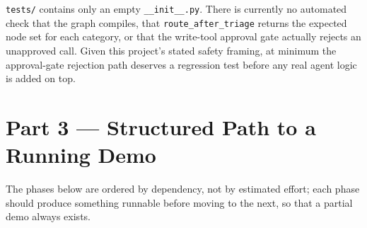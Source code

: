 \documentclass[11pt]{article}
\newenvironment{bugbox}[1]{%
  \begin{tcolorbox}[colback=bugred!5,colframe=bugred!70!black,title=\textbf{#1},fonttitle=\bfseries,boxrule=0.6pt]
}{\end{tcolorbox}}
\begin{document}
\begin{bugbox}{Bug 9 --- No test coverage}
\texttt{tests/} contains only an empty \texttt{\_\_init\_\_.py}. There is currently no automated check that the graph compiles, that \texttt{route\_after\_triage} returns the expected node set for each category, or that the write-tool approval gate actually rejects an unapproved call. Given this project's stated safety framing, at minimum the approval-gate rejection path deserves a regression test before any real agent logic is added on top.
\end{bugbox}

\section{Part 3 --- Structured Path to a Running Demo}
\label{sec:demo}

The phases below are ordered by dependency, not by estimated effort; each phase should produce something runnable before moving to the next, so that a partial demo always exists.
\end{document}
